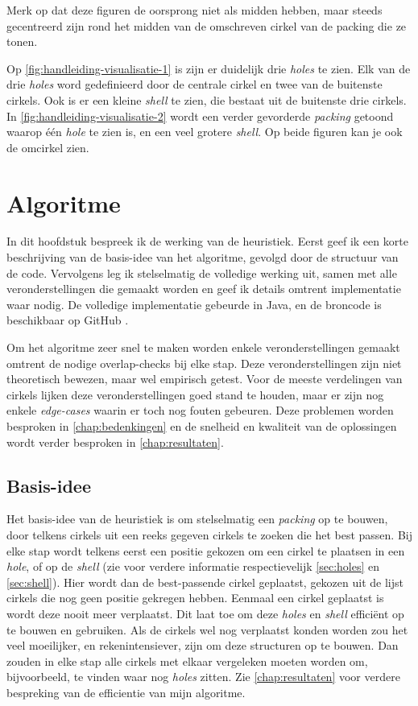 \documentclass[12pt,a4paper,oneside]{book}
\begin{document}
Merk op dat deze figuren de oorsprong niet als midden hebben, maar steeds gecentreerd zijn rond het midden van de omschreven cirkel van de packing die ze tonen.

Op \autoref{fig:handleiding-visualisatie-1} is zijn er duidelijk drie \textit{holes} te zien.
Elk van de drie \textit{holes} word gedefinieerd door de centrale cirkel en twee van de buitenste cirkels.
Ook is er een kleine \textit{shell} te zien, die bestaat uit de buitenste drie cirkels.
In \autoref{fig:handleiding-visualisatie-2} wordt een verder gevorderde \textit{packing} getoond waarop één \textit{hole} te zien is, en een veel grotere \textit{shell}.
Op beide figuren kan je ook de omcirkel zien.

\chapter{Algoritme} \label{chap:algoritme}

In dit hoofdstuk bespreek ik de werking van de heuristiek.
Eerst geef ik een korte beschrijving van de basis-idee van het algoritme, gevolgd door de structuur van de code.
Vervolgens leg ik stelselmatig de volledige werking uit, samen met alle veronderstellingen die gemaakt worden en geef ik details omtrent implementatie waar nodig.
De volledige implementatie gebeurde in Java, en de broncode is beschikbaar op GitHub \cite{circle-packing-github}.

Om het algoritme zeer snel te maken worden enkele veronderstellingen gemaakt omtrent de nodige overlap-checks bij elke stap.
Deze veronderstellingen zijn niet theoretisch bewezen, maar wel empirisch getest.
Voor de meeste verdelingen van cirkels lijken deze veronderstellingen goed stand te houden, maar er zijn nog enkele \textit{edge-cases} waarin er toch nog fouten gebeuren.
Deze problemen worden besproken in \autoref{chap:bedenkingen} en de snelheid en kwaliteit van de oplossingen wordt verder besproken in \autoref{chap:resultaten}.

\section{Basis-idee}

Het basis-idee van de heuristiek is om stelselmatig een \textit{packing} op te bouwen, door telkens cirkels uit een reeks gegeven cirkels te zoeken die het best passen.
Bij elke stap wordt telkens eerst een positie gekozen om een cirkel te plaatsen in een \textit{hole}, of op de \textit{shell} (zie voor verdere informatie respectievelijk \autoref{sec:holes} en \autoref{sec:shell}).
Hier wordt dan de best-passende cirkel geplaatst, gekozen uit de lijst cirkels die nog geen positie gekregen hebben.
Eenmaal een cirkel geplaatst is wordt deze nooit meer verplaatst.
Dit laat toe om deze \textit{holes} en \textit{shell} efficiënt op te bouwen en gebruiken.
Als de cirkels wel nog verplaatst konden worden zou het veel moeilijker, en rekenintensiever, zijn om deze structuren op te bouwen.
Dan zouden in elke stap alle cirkels met elkaar vergeleken moeten worden om, bijvoorbeeld, te vinden waar nog \textit{holes} zitten.
Zie \autoref{chap:resultaten} voor verdere bespreking van de efficientie van mijn algoritme.
\end{document}
